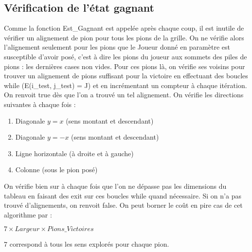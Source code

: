 \documentclass[a4paper, 10pt, french]{article}
\begin{document}
{    \subsection{Vérification de l'état gagnant}
    {
        Comme la fonction Est\_Gagnant est appelée après chaque coup, il est inutile de vérifier un alignement de pion pour
        tous les pions de la grille. On ne vérifie alors l'alignement seulement pour les pions que le Joueur donné en paramètre
        est susceptible d'avoir posé, c'est à dire les pions du joueur aux sommets des piles de pions : les dernières cases
        non vides.
        Pour ces pions là, on vérifie ses voisins pour trouver un alignement de pions suffisant pour la victoire en effectuant
        des boucles while (E(i\_test, j\_test) = J) et en incrémentant un compteur à chaque itération. On renvoit true dès que
        l'on a trouvé un tel alignement. On vérifie les directions suivantes à chaque fois :
        \begin{enumerate}
            \item Diagonale $y = x$ (sens montant et descendant)
            \item Diagonale $y = -x$ (sens montant et descendant)
            \item Ligne horizontale (à droite et à gauche)
            \item Colonne (sous le pion posé)
        \end{enumerate}
        On vérifie bien sur à chaque fois que l'on ne dépasse pas les dimensions du tableau en faisant des exit sur ces boucles
        while quand nécessaire. Si on n'a pas trouvé d'alignements, on renvoit false.
        On peut borner le coût en pire cas de cet algorithme par :
        \begin{center}
            $7 \times Largeur \times Pions\_Victoires$
        \end{center}
        7 correspond à tous les sens explorés pour chaque pion.
    }

}
\end{document}
